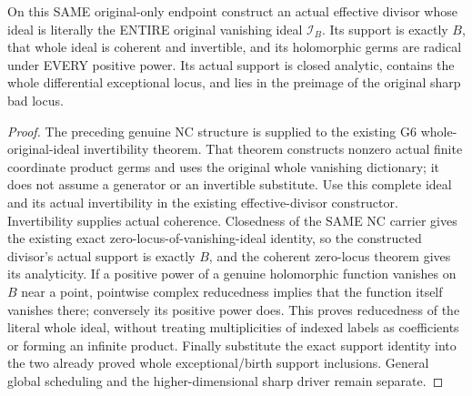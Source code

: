 \begin{theorem}
\label{hir:sharp-actual-original-born-reduced-cartier-divisor}
\leanok
On this SAME original-only endpoint construct an actual effective
divisor whose ideal is literally the ENTIRE original vanishing ideal
$\mathcal I_B$. Its support is exactly $B$, that whole ideal is
coherent and invertible, and its holomorphic germs are radical under
EVERY positive power. Its actual support is closed analytic, contains
the whole differential exceptional locus, and lies in the preimage of
the original sharp bad locus.
\end{theorem}
\begin{proof}
The preceding genuine NC structure is supplied to the existing G6
whole-original-ideal invertibility theorem. That theorem constructs
nonzero actual finite coordinate product germs and uses the original
whole vanishing dictionary; it does not assume a generator or an
invertible substitute. Use this complete ideal and its actual
invertibility in the existing effective-divisor constructor.
Invertibility supplies actual coherence. Closedness of the SAME NC
carrier gives the existing exact zero-locus-of-vanishing-ideal identity,
so the constructed divisor's actual support is exactly $B$, and the
coherent zero-locus theorem gives its analyticity. If a positive power
of a genuine holomorphic function vanishes on $B$ near a point,
pointwise complex reducedness implies that the function itself
vanishes there; conversely its positive power does. This proves
reducedness of the literal whole ideal, without treating multiplicities
of indexed labels as coefficients or forming an infinite product.
Finally substitute the exact support identity into the two already
proved whole exceptional/birth support inclusions. General global
scheduling and the higher-dimensional sharp driver remain separate.
\end{proof}
